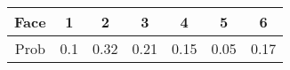 \begin{center}
    \begin{tabular}{|c|c|c|c|c|c|c|}
       \hline
       Face & 1 & 2 & 3 & 4 & 5 & 6 \\
       \hline
       Prob & 0.1 & 0.32 & 0.21 & 0.15 & 0.05 & 0.17\\
       \hline 
    \end{tabular}
\end{center}
